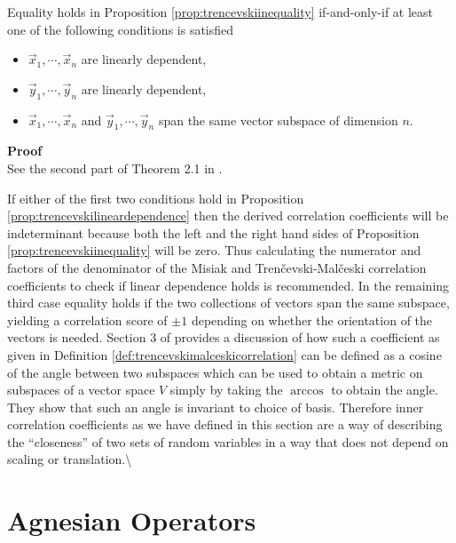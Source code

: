 \documentclass[
  letterpaper,
  DIV=11,
  numbers=noendperiod]{scrreprt}
\begin{document}
\begin{Proposition}[myproposition=\cite{trencevski2006}, label=prop:trencevskilineardependence]

Equality holds in Proposition \ref{prop:trencevskiinequality} if-and-only-if at least one of the following conditions is satisfied

\begin{itemize}
    \item $\vec{x}_1, \cdots, \vec{x}_n$ are linearly dependent,
    \item $\vec{y}_1, \cdots, \vec{y}_n$ are linearly dependent,
    \item $\vec{x}_1, \cdots, \vec{x}_n$ and $\vec{y}_1, \cdots, \vec{y}_n$ span the same vector subspace of dimension $n$.
\end{itemize}

\tcbline
\textbf{Proof}\\
See the second part of Theorem 2.1 in \cite{trencevski2006}.
\end{Proposition}

If either of the first two conditions hold in Proposition
\ref{prop:trencevskilineardependence} then the derived correlation
coefficients will be indeterminant because both the left and the right
hand sides of Proposition \ref{prop:trencevskiinequality} will be zero.
Thus calculating the numerator and factors of the denominator of the
Misiak and Tren\v cevski-Mal\v ceski correlation coefficients to check
if linear dependence holds is recommended. In the remaining third case
equality holds if the two collections of vectors span the same subspace,
yielding a correlation score of \(\pm 1\) depending on whether the
orientation of the vectors is needed. Section 3 of \cite{trencevski2006}
provides a discussion of how such a coefficient as given in Definition
\ref{def:trencevskimalceskicorrelation} can be defined as a cosine of
the angle between two subspaces which can be used to obtain a metric on
subspaces of a vector space \(V\) simply by taking the \(\arccos\) to
obtain the angle. They show that such an angle is invariant to choice of
basis. Therefore inner correlation coefficients as we have defined in
this section are a way of describing the ``closeness'' of two sets of
random variables in a way that does not depend on scaling or
translation.\textbackslash{}

\section{Agnesian Operators}\label{agnesian-operators}
\end{document}
